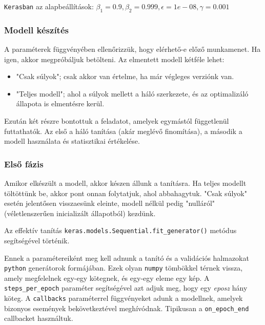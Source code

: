 \noindent
\texttt{Kerasban} az alapbeállítások: 
$ \beta_1=0.9, \beta_2=0.999, \epsilon=1e-08, \gamma=0.001 $



\subsubsection{Modell készítés}

A paraméterek függvényében ellenőrizzük, hogy elérhető-e előző munkamenet.
Ha igen, akkor megpróbáljuk betölteni. Az elmentett modell kétféle lehet:

\begin{samepage}
	\begin{itemize}
		\item 
		"Csak súlyok"; csak akkor van értelme, ha már végleges verziónk van.
		
		\item 	
		"Teljes modell"; ahol a súlyok mellett a háló szerkezete, és az optimalizáló állapota
		is elmentésre kerül.
	\end{itemize}
\end{samepage}





Ezután két részre bontottuk a feladatot, amelyek egymástól függetlenül futtathatók.
Az első a háló tanítása (akár meglévő finomítása), a második a modell használata 
és statisztikai értékelése.

\subsubsection{Első fázis}

Amikor elkészült a modell, akkor készen állunk a tanításra. Ha teljes modellt töltöttünk be,
akkor pont onnan folytatjuk, ahol abbahagytuk. "Csak súlyok" esetén jelentősen visszaesünk 
eleinte, modell nélkül pedig "nulláról"(véletlenszerűen inicializált állapotból) kezdünk.

Az effektív tanítás \texttt{keras.models.Sequential.fit\_generator()} metódus segítségével 
történik.

Ennek a paramétereiként meg kell adnunk a tanító és a validációs halmazokat \texttt{python} 
generátorok formájában. Ezek olyan \texttt{numpy} tömbökkel térnek vissza, amely megfelelnek 
egy-egy kötegnek, és egy-egy eleme egy kép. A \texttt{steps\_per\_epoch} paraméter segítségével azt adjuk
meg, hogy egy \textit{eposz} hány köteg. A \texttt{callbacks} paraméterrel függvényeket
adunk a modellnek, amelyek bizonyos események bekövetkeztével meghívódnak. Tipikusan a
\texttt{on\_epoch\_end} callbacket használtuk.

